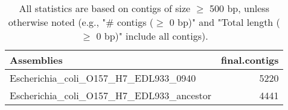 \documentclass[12pt,a4paper]{article}
\begin{document}
\begin{table}[ht]
\begin{center}
\caption{All statistics are based on contigs of size $\geq$ 500 bp, unless otherwise noted (e.g., "\# contigs ($\geq$ 0 bp)" and "Total length ($\geq$ 0 bp)" include all contigs).}
\begin{tabular}{|l*{1}{|r}|}
\hline
Assemblies & final.contigs \\ \hline
Escherichia\_coli\_O157\_H7\_EDL933\_0940 & 5220 \\ \hline
Escherichia\_coli\_O157\_H7\_EDL933\_ancestor & 4441 \\ \hline
\end{tabular}
\end{center}
\end{table}
\end{document}
